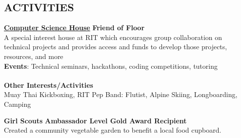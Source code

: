 \documentclass[line,margin]{res}
\begin{document}
\begin{resume}
\section{ACTIVITIES}
\href{https://csh.rit.edu}{\textbf{Computer Science House}}
\hfill
\textbf{Friend of Floor}\\
A special interest house at RIT which encourages group collaboration on technical 
projects and provides access and funds to develop those projects, resources, and more\\
\textbf{Events}: 
Technical seminars, hackathons, coding competitions, tutoring\\
\\\textbf{Other Interests/Activities}\\
Muay Thai Kickboxing, RIT Pep Band: Flutist, Alpine Skiing, Longboarding, Camping

\textbf{Girl Scouts} \hfill \textbf{Ambassador Level Gold Award Recipient}\\
Created a community vegetable garden to benefit a local food cupboard.

\end{resume}
\end{document}
